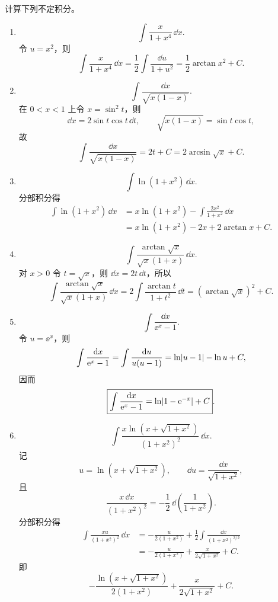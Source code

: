 \begin{xsolution}
计算下列不定积分。
  \begin{enumerate}[label=(\arabic*)]
    \item
    \[
      \int\frac{x}{1+x^4}\,\dd x.
    \]
    令 $u=x^2$，则
    \[
      \int\frac{x}{1+x^4}\,\dd x
      =\frac12\int\frac{\dd u}{1+u^2}
      =\frac12\arctan x^2+C.
    \]

    \item
    \[
      \int\frac{\dd x}{\sqrt{x(1-x)}}.
    \]
    在 $0<x<1$ 上令 $x=\sin^2t$，则
    \[
      \dd x=2\sin t\cos t\,\dd t,
      \qquad
      \sqrt{x(1-x)}=\sin t\cos t,
    \]
    故
    \[
      \int\frac{\dd x}{\sqrt{x(1-x)}}
      =2t+C
      =2\arcsin\sqrt{x}+C.
    \]

    \item
    \[
      \int\ln(1+x^2)\,\dd x.
    \]
    分部积分得
    \begin{align*}
      \int\ln(1+x^2)\,\dd x
      &=x\ln(1+x^2)-\int\frac{2x^2}{1+x^2}\,\dd x\\
      &=x\ln(1+x^2)-2x+2\arctan x+C.
    \end{align*}

    \item
    \[
      \int\frac{\arctan\sqrt{x}}{\sqrt{x}(1+x)}\,\dd x.
    \]
    对 $x>0$ 令 $t=\sqrt{x}$，则 $\dd x=2t\,\dd t$，所以
    \[
      \int\frac{\arctan\sqrt{x}}{\sqrt{x}(1+x)}\,\dd x
      =2\int\frac{\arctan t}{1+t^2}\,\dd t
      =(\arctan\sqrt{x})^2+C.
    \]

    \item
    \[
      \int\frac{\dd x}{\ee^x-1}.
    \]
    令 $u=\ee^x$，则
    \[
      \int\frac{\mathop{}\!\mathrm{d} x}{\mathrm{e}^x-1}
      =\int\frac{\mathop{}\!\mathrm{d} u}{u(u-1)}
      =\ln\lvert u-1\rvert-\ln u+C,
    \]
    因而
    \[
      \boxed{\int\frac{\mathop{}\!\mathrm{d} x}{\mathrm{e}^x-1}=\ln\lvert1-\mathrm{e}^{-x}\rvert+C}.
    \]

    \item
    \[
      \int\frac{x\ln(x+\sqrt{1+x^2})}{(1+x^2)^2}\,\dd x.
    \]
    记
    \[
      u=\ln(x+\sqrt{1+x^2}),
      \qquad
      \dd u=\frac{\dd x}{\sqrt{1+x^2}},
    \]
    且
    \[
      \frac{x\,\dd x}{(1+x^2)^2}
      =-\frac12\,\dd\left(\frac1{1+x^2}\right).
    \]
    分部积分得
    \begin{align*}
      \int\frac{x u}{(1+x^2)^2}\,\dd x
      &=-\frac{u}{2(1+x^2)}
        +\frac12\int\frac{\dd x}{(1+x^2)^{3/2}}\\
      &=-\frac{u}{2(1+x^2)}+\frac{x}{2\sqrt{1+x^2}}+C.
    \end{align*}
    即
    \[
      \boxed{-\frac{\ln(x+\sqrt{1+x^2})}{2(1+x^2)}
      +\frac{x}{2\sqrt{1+x^2}}+C}.
    \]


\end{enumerate}
\end{xsolution}
